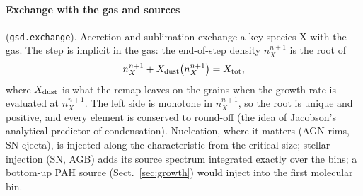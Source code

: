 \documentclass[11pt,a4paper]{article}
\begin{document}
\paragraph{Exchange with the gas and sources} (\texttt{gsd.exchange}). Accretion and sublimation exchange a key
species X with the gas. The step is implicit in the gas: the end-of-step density $n_X^{n+1}$ is the root of
\begin{equation}
n_X^{n+1} + X_{\rm dust}\big(n_X^{n+1}\big) = X_{\rm tot},
\end{equation}
where $X_{\rm dust}$ is what the remap leaves on the grains when the growth rate is evaluated at $n_X^{n+1}$. The left
side is monotone in $n_X^{n+1}$, so the root is unique and positive, and every element is conserved to round-off (the
idea of Jacobson's analytical predictor of condensation). Nucleation, where it matters (AGN rims, SN ejecta), is
injected along the characteristic from the critical size; stellar injection (SN, AGB) adds its source spectrum
integrated exactly over the bins; a bottom-up PAH source (Sect.~\ref{sec:growth}) would inject into the first
molecular bin.
\end{document}
